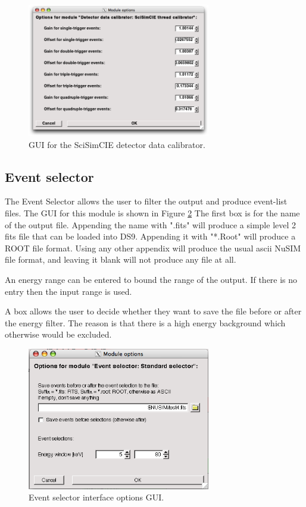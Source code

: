 \begin{figure}[tb]
 \begin{center}
  \includegraphics[width=8cm]{images/DetectorCalibratorSciSimCIEGUI.png}
  \caption{GUI for the SciSimCIE detector data calibrator.}
  \label{DCSciSimCIEGUI}
 \end{center}
\end{figure}

\subsection{Event selector}
The Event Selector allows the user to filter the output and produce event-list files. The GUI for this module is shown in Figure \ref{eventgui} The first box is for the name of the output file. Appending the name with ".fits" will produce a simple level 2 fits file that can be loaded into DS9. Appending it with "*.Root" will produce a ROOT file format. Using any other appendix will produce the usual ascii NuSIM file format, and leaving it blank will not produce any file at all.

An energy range can be entered to bound the range of the output. If there is no entry then the input range is used.

A box allows the user to decide whether they want to save the file before or after the energy filter. The reason is that there is a high energy background which otherwise would be excluded.

\begin{figure}[tb]
\begin{center}
\includegraphics[width=8cm]{images/eventselectorGUI.png}  
\caption{Event selector interface options GUI.}
\label{eventgui} 
\end{center}
\end{figure}


